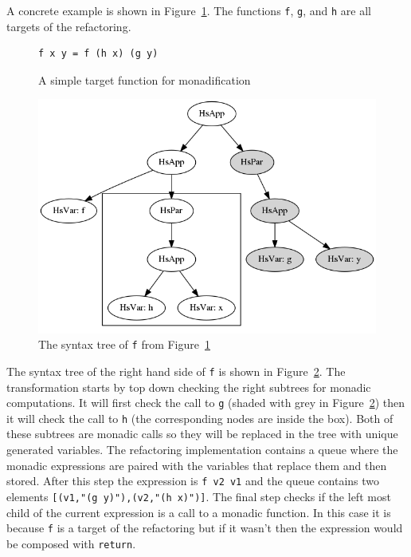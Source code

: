 A concrete example is shown in Figure~\ref{simpleMon}. The functions \texttt{f}, \texttt{g}, and \texttt{h} are all targets of the refactoring.

\begin{figure}[t]
\begin{lstlisting}
f x y = f (h x) (g y)
\end{lstlisting}
\caption{A simple target function for monadification}
\label{simpleMon}
\end{figure}  

\begin{figure}[t]
	\begin{center}
		\includegraphics[scale=.5]{graphVis/Chapter6/simpF.png}
	\end{center}
	\caption{The syntax tree of \texttt{f} from Figure~\ref{simpleMon}}
	\label{simpF}
\end{figure}

The syntax tree of the right hand side of \texttt{f} is shown in Figure~\ref{simpF}. The transformation starts by top down checking the right subtrees for monadic computations. It will first check the call to \texttt{g} (shaded with grey in Figure~\ref{simpF}) then it will check the call to \texttt{h} (the corresponding nodes are inside the box). Both of these subtrees are monadic calls so they will be replaced in the tree with unique generated variables. The refactoring implementation contains a queue where the monadic expressions are paired with the variables that replace them and then stored. After this step the expression is \texttt{f v2 v1} and the queue contains two elements \texttt{[(v1,"(g y)"),(v2,"(h x)")]}. The final step checks if the left most child of the current expression is a call to a monadic function. In this case it is because \texttt{f} is a target of the refactoring but if it wasn't then the expression would be composed with \texttt{return}.

